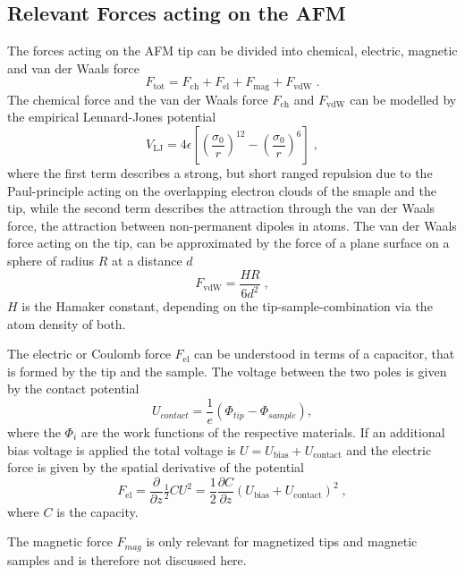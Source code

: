 \documentclass[a4paper]{scrartcl}
\numberwithin{equation}{section}
\numberwithin{figure}{section}
\numberwithin{table}{section}
\newcommand{\eq}[2]{\begin{equation}#1\label{#2}\end{equation}}
\begin{document}
\subsection{Relevant Forces acting on the AFM}
The forces acting on the AFM tip can be divided into chemical, electric, magnetic and van der Waals force
\eq{F_\text{tot}=F_\text{ch}+F_\text{el}+F_\text{mag}+F_\text{vdW} \; .} {forces}
The chemical force and the van der Waals force $F_\text{ch}$ and $F_\text{vdW}$ can be modelled by the empirical Lennard-Jones potential
\eq{V_\text{LJ}=4\epsilon\left[\left(\frac{\sigma_{0}}{r}\right)^{12}-\left(\frac{\sigma_{0}}{r}\right)^{6}\right] \; , }{jones}
where the first term describes a strong, but short ranged repulsion due to the Paul-principle acting on the overlapping electron clouds of the smaple and the tip, while the second term describes the attraction through the van der Waals force, the attraction between non-permanent dipoles in atoms. The van der Waals force acting on the tip, can be approximated by the force of a plane surface on a sphere of radius $R$ at a distance $d$ 
\begin{equation}
F_\text{vdW}=\frac{HR}{6d^{2}} \; ,
\end{equation}
$H$ is the Hamaker constant, depending on the tip-sample-combination via the atom density of both. 

The electric or Coulomb force $F_\text{el}$ can be understood in terms of a capacitor, that is formed by the tip and the sample. The voltage between the two poles is given by the contact potential
\begin{equation}
U_{contact}=\frac{1}{e}\left(\Phi_{tip}-\Phi_{sample}\right),
\end{equation}
where the $\Phi_i$ are the work functions of the respective materials. If an additional bias voltage is applied the total voltage is $U=U_\text{bias}+U_\text{contact}$ and the electric force is given by the spatial derivative of the potential 
\begin{equation}
F_\text{el}=\frac{\partial }{\partial z} \tfrac 1 2 C U^2 = \frac{1}{2} \frac{\partial C}{\partial z} (U_\text{bias}+U_\text{contact})^2 \; , \label{eq:elec}
\end{equation}
where $C$ is the capacity.

The magnetic force $F_{mag}$ is only relevant for magnetized tips and magnetic samples and is therefore not discussed here. 
\end{document}

